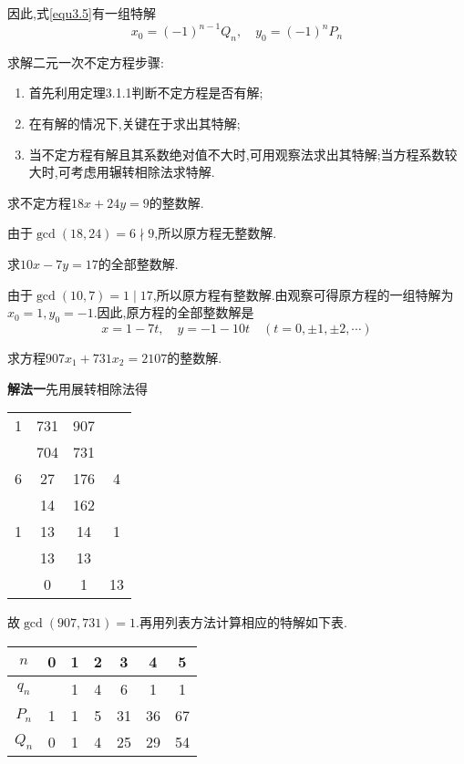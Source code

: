 因此,式\eqref{equ3.5}有一组特解
\begin{equation*}
	x_{0}=(-1)^{n-1} Q_{n}, \quad y_{0}=(-1)^{n} P_{n}
\end{equation*}

\remark 求解二元一次不定方程步骤:
\begin{enumerate}[itemindent=2em]
	\item[\ding{172}] 首先利用定理3.1.1判断不定方程是否有解;
	\item[\ding{173}] 在有解的情况下,关键在于求出其特解;
	\item[\ding{174}] 当不定方程有解且其系数绝对值不大时,可用观察法求出其特解;当方程系数较大时,可考虑用辗转相除法求特解.
\end{enumerate}

\example 求不定方程$18 x+24 y=9$的整数解.

\solve 由于$\operatorname{gcd}(18,24)=6\nmid 9$,所以原方程无整数解.

\example 求$10 x-7 y=17$的全部整数解.

\solve 由于$\operatorname{gcd}(10,7)=1 \mid 17$,所以原方程有整数解.由观察可得原方程的一组特解为$x_{0}=1, y_{0}=-1$.因此,原方程的全部整数解是
\begin{equation*}
	x=1-7 t, \quad y=-1-10 t \quad(t=0, \pm 1, \pm 2, \cdots)
\end{equation*}

\example 求方程$907 x_{1}+731 x_{2}=2107$的整数解.

\solve \textbf{解法一}先用展转相除法得
\begin{center}
	\begin{tabular}{c|cc|c}
		1 & 731 & 907 &   \\
		  & 704 & 731 &   \\ \cline{2-3}
		6 &  27 & 176 & 4 \\
		  &  14 & 162 &   \\ \cline{2-3}
		1 &  13 &  14 & 1 \\
		  &  13 &  13 &   \\ \cline{2-3}
		&    0 &    1 & 13 \\
	\end{tabular}	
\end{center}

故$\operatorname{gcd}(907,731)=1$.再用列表方法计算相应的特解如下表.
\begin{center}
	\begin{tabular}{|c|c|c|c|c|c|c|}
		\hline$n$ & 0 & 1 & 2 & 3 & 4 & 5\\
		\hline$q_{n}$ & & 1 & 4 & 6 & 1 & 1 \\
		\hline$P_{n}$ & 1 & 1 & 5 & 31 & 36 & 67 \\
		\hline$Q_{n}$ & 0 & 1 & 4 & 25 & 29 & 54 \\
		\hline
	\end{tabular}
\end{center}

